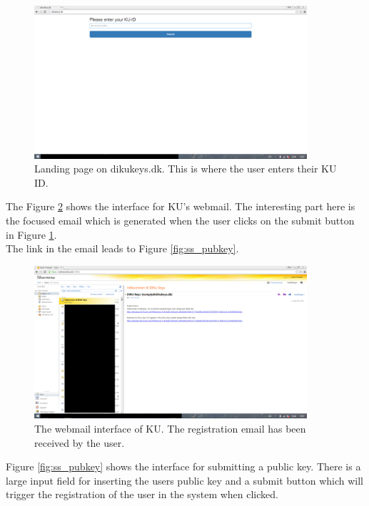 \documentclass[11pt,a4paper]{report}
\begin{document}
\begin{figure}[H]
\centering
\includegraphics[width=0.9\textwidth]{pictures/screenshots/kuid}
\caption{Landing page on dikukeys.dk. This is where the user enters their KU ID.}
\label{fig:ss_kuid}
\end{figure}
The Figure \ref{fig:ss_email} shows the interface for KU's webmail. The interesting part here is the focused email which is generated when the user clicks on the submit button in Figure \ref{fig:ss_kuid}. \\
The link in the email leads to Figure \ref{fig:ss_pubkey}.\\
\begin{figure}[H]
\centering
\includegraphics[width=0.9\textwidth]{pictures/screenshots/email}
\caption{The webmail interface of KU. The registration email has been received by the user.}
\label{fig:ss_email}
\end{figure}
Figure \ref{fig:ss_pubkey} shows the interface for submitting a public key. There is a large input field for inserting the users public key and a submit button which will trigger the registration of the user in the system when clicked.
\end{document}
